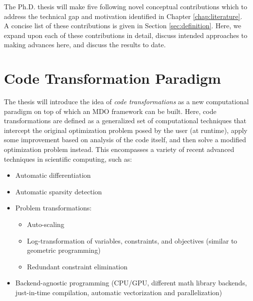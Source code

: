 \documentclass[12pt,vi,oneside,table]{report}
\begin{document}
    The Ph.D. thesis will make five following novel conceptual contributions which to address the technical gap and motivation identified in Chapter \ref{chap:literature}. A concise list of these contributions is given in Section \ref{sec:definition}. Here, we expand upon each of these contributions in detail, discuss intended approaches to making advances here, and discuss the results to date.


    \section{Code Transformation Paradigm}
    \label{sec:code_transformations}

    The thesis will introduce the idea of \textit{code transformations} as a new computational paradigm on top of which an MDO framework can be built. Here, code transformations are defined as a generalized set of computational techniques that intercept the original optimization problem posed by the user (at runtime), apply some improvement based on analysis of the code itself, and then solve a modified optimization problem instead. This encompasses a variety of recent advanced techniques in scientific computing, such as:
    \begin{itemize}[noitemsep]
        \item Automatic differentiation \cite{griewank_automatic_1988}
        \item Automatic sparsity detection \cite{gebremedhin_efficient_2009}
        \item Problem transformations:
        \begin{itemize}[noitemsep]
            \item Auto-scaling \cite{nocedal_numerical_2006}
            \item Log-transformation of variables, constraints, and objectives (similar to geometric programming) \cite{kirschen, agrawal_disciplined_2019}
            \item Redundant constraint elimination
        \end{itemize}
        \item Backend-agnostic programming (CPU/GPU, different math library backends, just-in-time compilation, automatic vectorization and parallelization) \cite{jax}
    \end{itemize}
\end{document}
